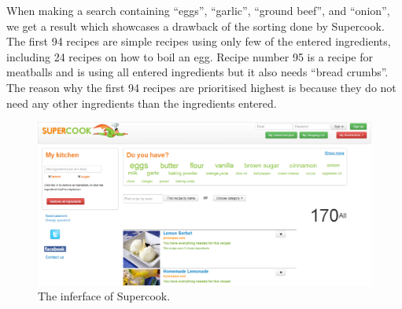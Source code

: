 When making a search containing ``eggs'', ``garlic'', ``ground beef'', and ``onion'', we get a result which showcases a drawback of the sorting done by Supercook. The first 94 recipes are simple recipes using only few of the entered ingredients, including 24 recipes on how to boil an egg. Recipe number 95 is a recipe for meatballs and is using all entered ingredients but it also needs ``bread crumbs''. The reason why the first 94 recipes are prioritised highest is because they do not need any other ingredients than the ingredients entered.
\begin{figure}[H]
\centering
\includegraphics[width=\linewidth]{img/screenshots/supercook.png}
\caption{The inferface of Supercook.}
\label{fig:supercook}
\end{figure}

